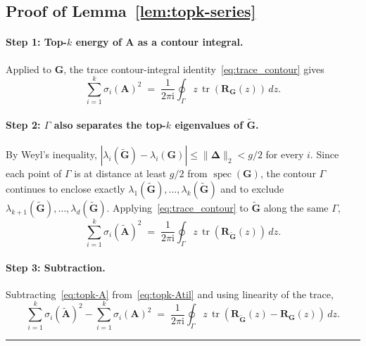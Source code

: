 \documentclass{article}
\newcommand{\twonorm}[1]{\|#1\|_2}
\newcommand{\Ab}{\mathbf{A}}
\newcommand{\Gb}{\mathbf{G}}
\newcommand{\Rb}{\mathbf{R}}
\newcommand{\Abtil}{\tilde{\Ab}}
\newcommand{\Gbtil}{\tilde{\Gb}}
\newcommand{\BlackBox}{\rule{1.5ex}{1.5ex}}  %
\newenvironment{proof}{\par\noindent{\bf Proof\ }}{\hfill\BlackBox\par\medskip}
\newcommand{\tr}{\mathop{\mathrm{tr}}}
\newcommand{\rbr}[1]{\left(#1\right)}
\newcommand{\abr}[1]{\left|#1\right|}
\newcommand{\Deltab}{\boldsymbol{\Delta}}
\begin{document}
\subsection{Proof of Lemma~\ref{lem:topk-series}}\label{app:topk-series}

\begin{proof}
\paragraph{Step 1: Top-$k$ energy of $\Ab$ as a contour integral.}
Applied to $\Gb$, the trace contour-integral identity~\eqref{eq:trace_contour} gives
\begin{equation}\label{eq:topk-A}
    \sum_{i=1}^{k}\sigma_i(\Ab)^2 \;=\; \frac{1}{2\pi \mathrm{i}}\oint_\Gamma z\,\tr\rbr{\Rb_\Gb(z)}\,dz.
\end{equation}

\paragraph{Step 2: $\Gamma$ also separates the top-$k$ eigenvalues of $\Gbtil$.}
By Weyl's inequality, $\abr{\lambda_i(\Gbtil) - \lambda_i(\Gb)} \le \twonorm{\Deltab} < g/2$ for every $i$. Since each point of $\Gamma$ is at distance at least $g/2$ from $\operatorname{spec}(\Gb)$, the contour $\Gamma$ continues to enclose exactly $\lambda_1(\Gbtil),\dots,\lambda_k(\Gbtil)$ and to exclude $\lambda_{k+1}(\Gbtil),\dots,\lambda_d(\Gbtil)$. Applying~\eqref{eq:trace_contour} to $\Gbtil$ along the same $\Gamma$,
\begin{equation}\label{eq:topk-Atil}
    \sum_{i=1}^{k}\sigma_i(\Abtil)^2 \;=\; \frac{1}{2\pi \mathrm{i}}\oint_\Gamma z\,\tr\rbr{\Rb_{\Gbtil}(z)}\,dz.
\end{equation}

\paragraph{Step 3: Subtraction.}
Subtracting~\eqref{eq:topk-A} from~\eqref{eq:topk-Atil} and using linearity of the trace,
\begin{equation}\label{eq:topk-shift}
    \sum_{i=1}^{k}\sigma_i(\Abtil)^2 - \sum_{i=1}^{k}\sigma_i(\Ab)^2 \;=\; \frac{1}{2\pi \mathrm{i}}\oint_\Gamma z\,\tr\rbr{\Rb_{\Gbtil}(z) - \Rb_\Gb(z)}\,dz.
\end{equation}


\end{proof}
\end{document}

